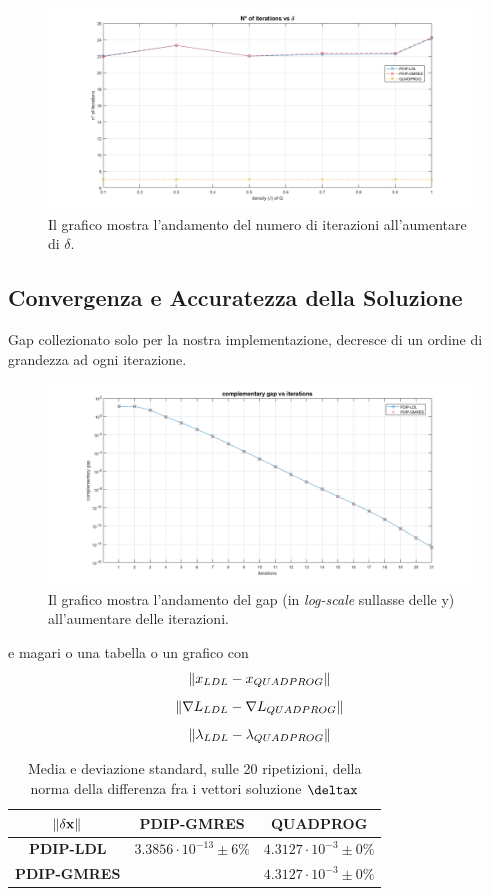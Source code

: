 \begin{figure}[!h]
    \centering
    \includegraphics[width=\textwidth]{img/MU9.png}
    \caption{Il grafico mostra l'andamento del numero di iterazioni all'aumentare di $\delta$. \label{fig:exp3.2}}
\end{figure}

\subsection*{Convergenza e Accuratezza della Soluzione}


Gap collezionato solo per la nostra implementazione, decresce di un ordine di grandezza ad ogni iterazione.
\begin{figure}[h]
    \centering
    \includegraphics[width=\textwidth]{img/MU6.png}
    \caption{Il grafico mostra l'andamento del gap (in \textit{log-scale} sullasse delle y) all'aumentare delle iterazioni. \label{fig:gap}}
\end{figure}

e magari o una tabella o un grafico con
$$ \left\lVert x_{LDL} - x_{QUADPROG}\right\rVert $$
$$ \left\lVert\nabla L_{LDL} - \nabla L_{QUADPROG}\right\rVert $$
$$ \left\lVert\lambda_{LDL} - \lambda_{QUADPROG}\right\rVert $$

\begin{table}[h!]
\centering
\begin{tabular}{c|c|l|c}
$\mathbf{\left\lVert\delta x\right\rVert}$ & \multicolumn{2}{c|}{\textbf{PDIP-GMRES}}         & \textbf{QUADPROG}          \\ \hline
\textbf{PDIP-LDL}            & \multicolumn{2}{c|}{$3.3856\cdot10^{-13}\pm6\%$} & $4.3127\cdot10^{-3}\pm0\%$ \\ \hline
\textbf{PDIP-GMRES}          & \multicolumn{2}{c|}{}                            & $4.3127\cdot10^{-3}\pm0\%$
\end{tabular}
\caption{Media e deviazione standard, sulle 20 ripetizioni, della norma della differenza fra i vettori soluzione $\deltax$\label{tab:normx}}
\end{table}

